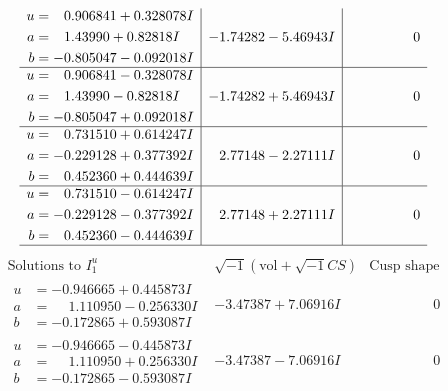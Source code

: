 \documentclass[1p]{elsarticle_modified}
\theoremstyle{definition}
\newcommand{\I}{\sqrt{-1}}
\begin{document}
$$\begin{array}{c|c|c}
\begin{aligned}
u &= \phantom{-}0.906841 + 0.328078 I \\
a &= \phantom{-}1.43990 + 0.82818 I \\
b &= -0.805047 - 0.092018 I\end{aligned}
 & -1.74282 - 5.46943 I & \phantom{-0.000000 } 0 \\ \hline\begin{aligned}
u &= \phantom{-}0.906841 - 0.328078 I \\
a &= \phantom{-}1.43990 - 0.82818 I \\
b &= -0.805047 + 0.092018 I\end{aligned}
 & -1.74282 + 5.46943 I & \phantom{-0.000000 } 0 \\ \hline\begin{aligned}
u &= \phantom{-}0.731510 + 0.614247 I \\
a &= -0.229128 + 0.377392 I \\
b &= \phantom{-}0.452360 + 0.444639 I\end{aligned}
 & \phantom{-}2.77148 - 2.27111 I & \phantom{-0.000000 } 0 \\ \hline\begin{aligned}
u &= \phantom{-}0.731510 - 0.614247 I \\
a &= -0.229128 - 0.377392 I \\
b &= \phantom{-}0.452360 - 0.444639 I\end{aligned}
 & \phantom{-}2.77148 + 2.27111 I & \phantom{-0.000000 } 0\\
 \hline 
 \end{array}$$\newpage$$\begin{array}{c|c|c}  
\text{Solutions to }I^u_{1}& \I (\text{vol} + \sqrt{-1}CS) & \text{Cusp shape}\\
 \hline 
\begin{aligned}
u &= -0.946665 + 0.445873 I \\
a &= \phantom{-}1.110950 - 0.256330 I \\
b &= -0.172865 + 0.593087 I\end{aligned}
 & -3.47387 + 7.06916 I & \phantom{-0.000000 } 0 \\ \hline\begin{aligned}
u &= -0.946665 - 0.445873 I \\
a &= \phantom{-}1.110950 + 0.256330 I \\
b &= -0.172865 - 0.593087 I\end{aligned}
 & -3.47387 - 7.06916 I & \phantom{-0.000000 } 0 \\ \hline\begin{aligned}

\end{aligned}
\end{array}$$
\end{document}
